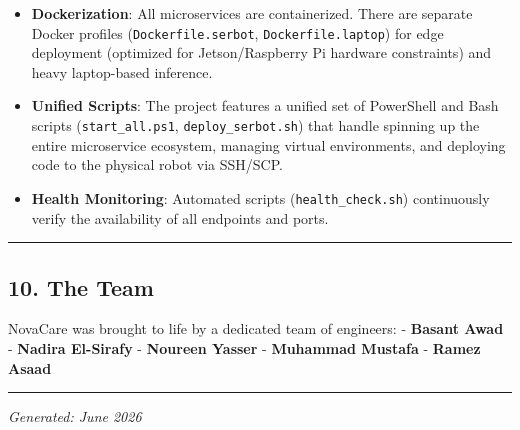 \documentclass[
]{article}
\providecommand{\tightlist}{%
  \setlength{\itemsep}{0pt}\setlength{\parskip}{0pt}}
\begin{document}
\begin{itemize}
\tightlist
\item
  \textbf{Dockerization}: All microservices are containerized. There are
  separate Docker profiles (\texttt{Dockerfile.serbot},
  \texttt{Dockerfile.laptop}) for edge deployment (optimized for
  Jetson/Raspberry Pi hardware constraints) and heavy laptop-based
  inference.
\item
  \textbf{Unified Scripts}: The project features a unified set of
  PowerShell and Bash scripts (\texttt{start\_all.ps1},
  \texttt{deploy\_serbot.sh}) that handle spinning up the entire
  microservice ecosystem, managing virtual environments, and deploying
  code to the physical robot via SSH/SCP.
\item
  \textbf{Health Monitoring}: Automated scripts
  (\texttt{health\_check.sh}) continuously verify the availability of
  all endpoints and ports.
\end{itemize}

\begin{center}\rule{0.5\linewidth}{0.5pt}\end{center}

\subsection{10. The Team}\label{the-team}

NovaCare was brought to life by a dedicated team of engineers: -
\textbf{Basant Awad} - \textbf{Nadira El-Sirafy} - \textbf{Noureen
Yasser} - \textbf{Muhammad Mustafa} - \textbf{Ramez Asaad}

\begin{center}\rule{0.5\linewidth}{0.5pt}\end{center}

\emph{Generated: June 2026}
\end{document}
